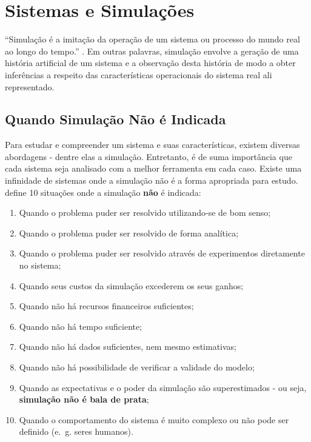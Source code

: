 \chapter{\label{chap:simulation}Sistemas e Simulações}

``Simulação é a imitação da operação de um sistema ou processo do mundo real ao
longo do tempo.'' \cite{Banks}. Em outras palavras, simulação envolve a geração
de uma história artificial de um sistema e a observação desta história de modo a
obter inferências a respeito das características operacionais do sistema real
ali representado.

\section{Quando Simulação Não é Indicada}

Para estudar e compreender um sistema e suas características, existem diversas
abordagens - dentre elas a simulação. Entretanto, é de suma importância que cada
sistema seja analisado com a melhor ferramenta em cada caso. Existe uma
infinidade de sistemas onde a simulação não é a forma apropriada para estudo.
\cite{BanksGibson} define 10 situações onde a simulação \textbf{não} é indicada:

\begin{enumerate}
\item Quando o problema puder ser resolvido utilizando-se de bom senso;
\item Quando o problema puder ser resolvido de forma analítica;
\item Quando o problema puder ser resolvido através de experimentos diretamente
      no sistema;
\item Quando seus custos da simulação excederem os seus ganhos;
\item Quando não há recursos financeiros suficientes;
\item Quando não há tempo suficiente;
\item Quando não há dados suficientes, nem mesmo estimativas;
\item Quando não há possibilidade de verificar a validade do modelo;
\item Quando as expectativas e o poder da simulação são superestimados - ou
      seja, \textbf{simulação não é bala de prata};
\item Quando o comportamento do sistema é muito complexo ou não pode ser
      definido (e.~g. seres humanos).
\end{enumerate}


